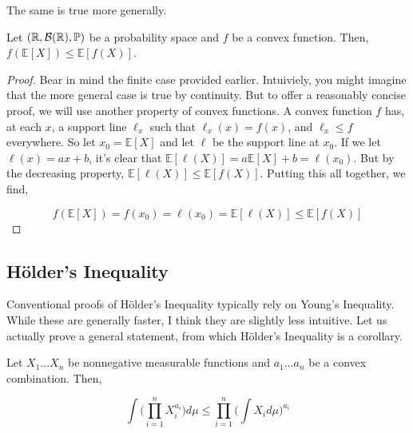     The same is true more generally. 


    \begin{theorem}
        Let $(\mathbb R, \mathcal B(\mathbb R), \mathbb P)$ be a probability space and 
        $f$ be a convex function. Then, $f(\mathbb E[X]) \leq \mathbb E[f(X)]$. 
    \end{theorem}

    \begin{proof}
        
        Bear in mind the finite case provided earlier. Intuiviely, you might imagine that 
        the more general case is true by continuity. But to offer a reasonably concise proof, 
        we will use another property of convex functions. A convex function $f$ has, at each $x$, 
        a support line $\ell_x$ such that $\ell_x(x) = f(x)$, and $\ell_x \leq f$ everywhere. 
        So let $x_0 = \mathbb E[X]$ and let $\ell$ be the support line at $x_0$. If we let 
        $\ell(x) = ax + b$, it's clear that $\mathbb E[\ell(X)] = a \mathbb E[X] + b = \ell(x_0)$. 
        But by the decreasing property, $\mathbb E[\ell(X)] \leq \mathbb E[f(X)]$. Putting this all 
        together, we find,

        \[ f(\mathbb E[X]) = f(x_0) = \ell(x_0) = \mathbb E[\ell(X)] \leq \mathbb E[f(X)] \]

    \end{proof}

    \subsection{Hölder's Inequality}

    Conventional proofs of Hölder's Inequality typically rely 
    on Young's Inequality. While these are generally faster, I think they 
    are slightly less intuitive. Let us actually prove a general statement, 
    from which Hölder's Inequality is a corollary. 

    \begin{theorem}
        Let $X_1...X_n$ be nonnegative measurable functions and 
        $a_1...a_n$ be a convex combination. Then, 

        \[ \int\bigg(\prod_{i=1}^n X_i^{a_i}\bigg)d\mu \leq \prod_{i=1}^n \bigg(\int X_i d\mu \bigg)^{a_i}  \]
    \end{theorem}

